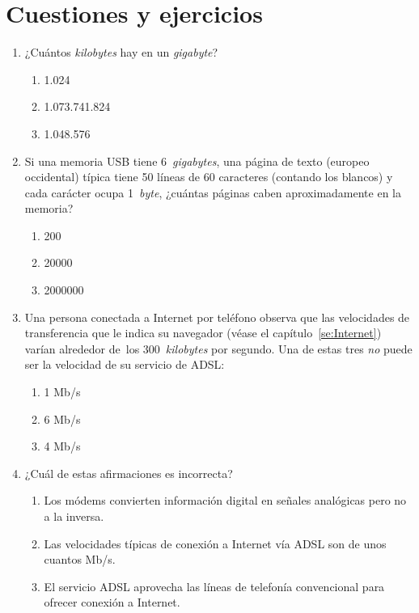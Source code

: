\section{Cuestiones y ejercicios} \begin{enumerate} \item ¿Cuántos
  \emph{kilobytes} hay en un \emph{gigabyte}? \begin{enumerate} \item 1.024 \item 1.073.741.824 \item 1.048.576 \end{enumerate} 

\item Si una memoria USB tiene 6~\emph{gigabytes}, una página de texto (europeo occidental) típica tiene 50 líneas de 60 caracteres (contando los blancos) y cada carácter ocupa 1~\emph{byte}, ¿cuántas páginas caben aproximadamente en la memoria? \begin{enumerate} \item 200 \item 20000 \item 2000000 \end{enumerate} 

\item Una persona conectada a Internet por teléfono observa que las velocidades de transferencia que le indica su navegador (véase el capítulo~\ref{se:Internet}) varían alrededor de~los 300~\emph{kilobytes} por segundo. Una de estas tres \emph{no} puede ser la velocidad de su servicio de ADSL: \begin{enumerate} \item 1 Mb/s \item 6 Mb/s \item 4 Mb/s \end{enumerate} 

\item ¿Cuál de estas afirmaciones es incorrecta? \begin{enumerate} \item Los módems convierten información digital en señales analógicas pero no a la inversa. \item Las velocidades típicas de conexión a Internet vía ADSL son de unos cuantos Mb/s. \item El servicio ADSL aprovecha las líneas de telefonía convencional para ofrecer conexión a Internet. \end{enumerate} 


\end{enumerate}
